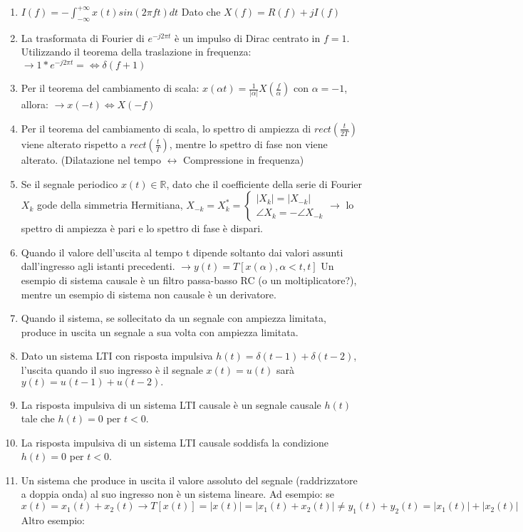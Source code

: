 \documentclass[12pt
]{article}
\begin{document}
\begin{enumerate}
	\item
		$\displaystyle I(f) =- \int_{- \infty}^{+\infty} x(t) sin(2\pi ft)dt$
	\newline
	Dato che $\displaystyle X(f) = R(f)+ jI(f)$
	\item
	La trasformata di Fourier di \(e^{-j2\pi t}\) è un impulso di Dirac
	centrato in \(f = 1\).
	Utilizzando il teorema della traslazione in frequenza: \newline
	$\to 1*e^{-j2 \pi t} =\Leftrightarrow \delta (f+1)$
	\item
	Per il teorema del cambiamento di scala:
	\newline
	$\displaystyle x(\alpha t) = \frac{1}{|\alpha|} X(\frac{f}{\alpha})$ con $\alpha = -1$, allora:
	$\to x(-t) \Leftrightarrow X(-f)$
	\item
	Per il teorema del cambiamento di scala, lo spettro di ampiezza di
	\(rect(\frac{t}{2T})\) viene alterato rispetto a
	\(rect(\frac{t}{T})\), mentre lo spettro di fase non viene alterato. \newline
	(Dilatazione nel tempo $\leftrightarrow$ Compressione in frequenza)
	\item
	Se il segnale periodico $x(t) \in \mathbb{R}$, dato che il coefficiente della serie di Fourier $X_k$ gode della simmetria Hermitiana,
	\newline
	$X_{-k} =X_k^* = \begin{cases}
		|X_k| =|X_{-k}| \\
		\angle X_k = - \angle X_{-k}
	\end{cases} \to$
	lo spettro di ampiezza è pari e lo spettro di fase è dispari.
	\item
	Quando il valore dell'uscita al tempo t dipende soltanto dai valori assunti dall'ingresso agli istanti precedenti. $\to y(t) = T[x(\alpha), \alpha < t, t]$  \newline  Un esempio di sistema
	causale è un filtro passa-basso RC (o un moltiplicatore?), mentre un esempio di sistema non
	causale è un derivatore.
	\item
	Quando il sistema, se sollecitato da un segnale con ampiezza limitata, produce in uscita un segnale a sua volta con ampiezza limitata.
	\item
	Dato un sistema LTI con risposta impulsiva
	\(h(t) = \delta(t - 1) + \delta(t - 2)\), l'uscita quando il suo
	ingresso è il segnale \(x(t) = u(t)\) sarà
	\(y(t) = u(t - 1) + u(t - 2).\)
	\item
	La risposta impulsiva di un sistema LTI causale è un segnale causale
	\(h(t)\) tale che \(h(t) = 0\) per \(t < 0\).
	\item
	La risposta impulsiva di un sistema LTI causale soddisfa la condizione
	\(h(t) = 0\) per \(t < 0\).
	\item
	Un sistema che produce in uscita il valore assoluto del segnale (raddrizzatore a doppia onda) al suo ingresso non è un sistema lineare. Ad esempio:
	\newline
	se $ \displaystyle x(t)=  x_1(t)+x_2(t) \to T[x(t)]  = |x(t)| = |x_1(t)+x_2(t)| \neq y_1(t)+y_2(t) = |x_1(t)|+|x_2(t)|$\newline
	\\
	Altro esempio:
	

\end{enumerate}
\end{document}
